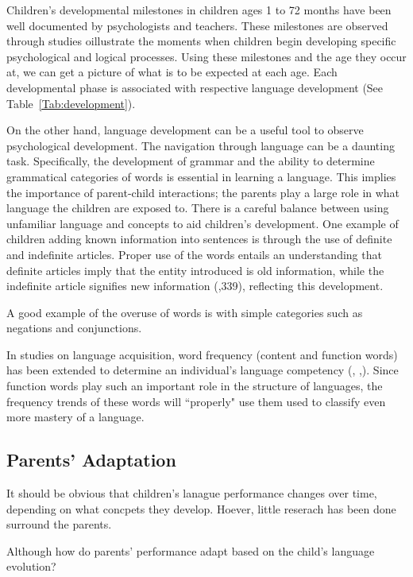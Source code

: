 \documentclass{article}
\theoremstyle{plain}
\theoremstyle{definition}
\theoremstyle{remark}
\numberwithin{equation}{section}
\begin{document}
Children’s developmental milestones in children ages 1 to 72 months have been well documented by psychologists and teachers. These milestones are observed through studies oillustrate the moments when children begin developing specific psychological and logical processes. Using these milestones and the age they occur at, we can get a picture of what is to be expected at each age. Each developmental phase is associated with respective language development (See Table~\ref{Tab:development}).

On the other hand, language development can be a useful tool to observe psychological development. The navigation through language can be a daunting task. Specifically, the development of grammar and the ability to determine grammatical categories of words is essential in learning a language. This implies the importance of parent-child interactions; the parents play a large role in what language the children are exposed to. There is a careful balance between using unfamiliar language and concepts to aid children's development. One example of children adding known information into sentences is through the use of definite and indefinite articles. Proper use of the words entails an understanding that definite articles imply that the entity introduced is old information, while the indefinite article signifies new information (\cite{clark2009first},339), reflecting this development.

A good example of the overuse of words is with simple categories such as negations and conjunctions. 

In studies on language acquisition, word frequency (content and function words) has been extended to determine an individual's language competency (\cite{feldman2019speech}, \cite{choi2018article},\cite{jasbi2020neg}). Since function words play such an important role in the structure of languages, the frequency trends of these words will ``properly" use them used to classify even more mastery of a language.

 

\subsection{Parents' Adaptation}

It should be obvious that children's lanague performance changes over time, depending on what concpets they develop. Hoever, little reserach has been done surround the parents. 

Although how do parents' performance adapt based on the child's language evolution? 
\end{document}
